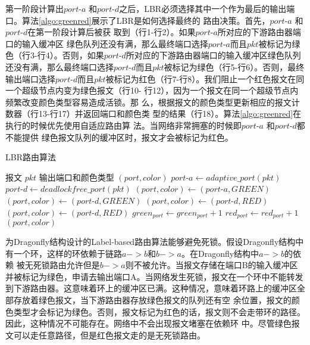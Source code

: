 第一阶段计算出$port\textrm{-}a$ 和$port\textrm{-}d$之后，LBR必须选择其中一个作为最后的输出端口。算法\ref{algo:greenred}展示了LBR是如何选择最终的
路由决策。首先，$port\textrm{-}a$ 和$port\textrm{-}d$在第一阶段计算后被获
取到（行1-行2）。如果$port\textrm{-}a$所对应的下游路由器端口的输入缓冲区
绿色队列还没有满，那么最终端口选择$port\textrm{-}a$而且$pkt$被标记为绿色（行3-行4）。否则，如果$port\textrm{-}d$所对应的下游路由器端口的输入缓冲区绿色队列还没有满，那么最终端口选择$port\textrm{-}d$而且$pkt$被标记为绿色（行5-行6）。否则，最终输出端口选择$port\textrm{-}d$而且$pkt$被标记为红色（行7-行8）。我们阻止一个红色报文在同一个超级节点内变为绿色报文（行10- 行12），因为一个报文在同一个超级节点内频繁改变颜色类型容易造成活锁。那
么，根据报文的颜色类型更新相应的报文计数器（行13-行17）并返回端口和颜色类
型的结果（行18）。算法\ref{algo:greenred}在执行的时候优先使用自适应路由算
法。当网络非常拥塞的时候即$port\textrm{-}a$ 和$port\textrm{-}d$都不能提供
绿色报文队列的缓冲区时，报文才会被标记为红色。

\begin{algorithm}[t]
  \centering
  \caption{LBR路由算法}
  \label{algo:greenred}
  \begin{algorithmic}[1]
    \REQUIRE 报文 $pkt$
    \ENSURE 输出端口和颜色类型 $(port, color)$
    \STATE $port\textrm{-}a \leftarrow adaptive\_port(pkt)$
    \STATE $port\textrm{-}d \leftarrow deadlockfree\_port(pkt)$
    \STATE $(port, color) \leftarrow (port\textrm{-}a, GREEN)$
    \STATE $(port, color) \leftarrow (port\textrm{-}d, GREEN)$
    \ELSE
    \STATE $(port, color) \leftarrow (port\textrm{-}d, RED)$
    \ENDIF
    \STATE $(port, color) \leftarrow (port\textrm{-}d, RED)$
    \ENDIF
    \STATE $green_{port} \leftarrow green_{port} + 1$
    \ELSE
    \STATE $red_{port} \leftarrow red_{port} + 1$
    \ENDIF
    \RETURN $(port, color)$
  \end{algorithmic}
\end{algorithm}

为Dragonfly结构设计的Label-based路由算法能够避免死锁。假设Dragonfly结构中
有一个环，这样的环依赖于链路$a->b$和$b->a$。在Dragonfly结构中$a->b$的依赖
被无死锁路由允许但是$b->a$则不被允许。当报文存储在端口B的输入缓冲区并被标记为绿色，申请去输出端口A。当网络发生死锁，报文在一个环中不能转发到下游路由器。这意味着环上的缓冲区已满。这种情况，意味着环路上的缓冲区全部存放着绿色报文，当下游路由器存放绿色报文的队列还有空
余位置，报文的颜色类型才会标记为绿色。否则，报文标记为红色的话，报文则不会走带环的路径。因此，这种情况不可能存在。网络中不会出现报文堵塞在依赖环
中。尽管绿色报文可以走任意路径，但是红色报文走的是无死锁路由。

